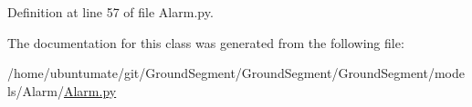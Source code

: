 Definition at line 57 of file Alarm.\+py.



The documentation for this class was generated from the following file\+:\begin{DoxyCompactItemize}
\item 
/home/ubuntumate/git/\+Ground\+Segment/\+Ground\+Segment/\+Ground\+Segment/models/\+Alarm/\hyperlink{_alarm_8py}{Alarm.\+py}\end{DoxyCompactItemize}

